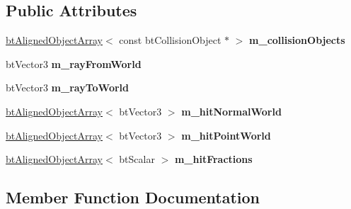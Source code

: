 \subsection*{Public Attributes}
\begin{DoxyCompactItemize}
\item 
\mbox{\label{structbtCollisionWorld_1_1AllHitsRayResultCallback_a44bb0d3f3cdf9c86e622b85262465454}} 
\hyperlink{classbtAlignedObjectArray}{bt\+Aligned\+Object\+Array}$<$ const bt\+Collision\+Object $\ast$ $>$ {\bfseries m\+\_\+collision\+Objects}
\item 
\mbox{\label{structbtCollisionWorld_1_1AllHitsRayResultCallback_ac8a1a6c242d9aa153df571e9d87e86ac}} 
bt\+Vector3 {\bfseries m\+\_\+ray\+From\+World}
\item 
\mbox{\label{structbtCollisionWorld_1_1AllHitsRayResultCallback_a08624d7ca9e0c24decd0b3697293cc03}} 
bt\+Vector3 {\bfseries m\+\_\+ray\+To\+World}
\item 
\mbox{\label{structbtCollisionWorld_1_1AllHitsRayResultCallback_a43f357feaa5fdd4f0c682a35e8b34fe9}} 
\hyperlink{classbtAlignedObjectArray}{bt\+Aligned\+Object\+Array}$<$ bt\+Vector3 $>$ {\bfseries m\+\_\+hit\+Normal\+World}
\item 
\mbox{\label{structbtCollisionWorld_1_1AllHitsRayResultCallback_a14a6f364a712f7dc238ca5145a625579}} 
\hyperlink{classbtAlignedObjectArray}{bt\+Aligned\+Object\+Array}$<$ bt\+Vector3 $>$ {\bfseries m\+\_\+hit\+Point\+World}
\item 
\mbox{\label{structbtCollisionWorld_1_1AllHitsRayResultCallback_ad9428dfd72bfae76602f487806594cc3}} 
\hyperlink{classbtAlignedObjectArray}{bt\+Aligned\+Object\+Array}$<$ bt\+Scalar $>$ {\bfseries m\+\_\+hit\+Fractions}
\end{DoxyCompactItemize}


\subsection{Member Function Documentation}
\mbox{\label{structbtCollisionWorld_1_1AllHitsRayResultCallback_a351da818747c246011624b9cb613c29b}} 
